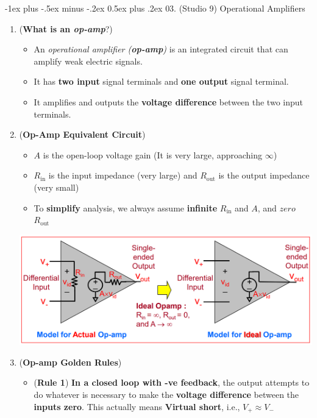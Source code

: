 \documentclass[10pt, landscape]{article}
\makeatletter
\renewcommand{\section}{\@startsection{section}{1}{0mm}%
                                {-1ex plus -.5ex minus -.2ex}%
                                {0.5ex plus .2ex}%
                                {\normalfont\large\bfseries}}
\makeatother
\begin{document}
\begin{multicols}{4}
\section{03. (Studio 9) Operational Amplifiers}
\begin{enumerate}
    \item (\textbf{What is an \textit{op-amp}}?)
    \begin{itemize}
        \item An \textit{operational amplifier (\textbf{op-amp})} is an integrated circuit that can amplify weak electric signals.
        \item It has \textbf{two input} signal terminals and \textbf{one output} signal terminal.
        \item It amplifies and outputs the \textbf{voltage difference} between the two input terminals.
    \end{itemize}
    \item (\textbf{Op-Amp Equivalent Circuit})
    \begin{itemize}
        \item $A$ is the open-loop voltage gain (It is very large, approaching $\infty$)
        \item $R_{\text{in}}$ is the input impedance (very large) and $R_{\text{out}}$ is the output impedance (very small)
        \item To \textbf{simplify} analysis, we always assume \textbf{infinite} $R_{\text{in}}$ and $A$, and $zero$ $R_{\text{out}}$
    \end{itemize}
    \centerline{\includegraphics[width=0.9\linewidth]{images/op-amp-equivalent-circuit.png}}
    \item (\textbf{Op-amp Golden Rules})
    \begin{itemize}
        \item (\textbf{Rule 1}) \textbf{In a closed loop with -ve feedback}, the output attempts to do whatever is necessary to make the \textbf{voltage difference} between the \textbf{inputs zero}. This actually means \textbf{Virtual short}, i.e., $V_+\approx V_-$

\end{itemize}
\end{enumerate}
\end{multicols}
\end{document}
